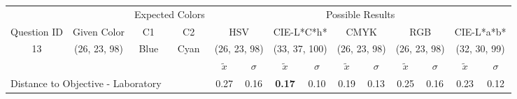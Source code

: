 \begin{table}[H]
  \resizebox{\textwidth}{!} {
  \begin{tabular}{lccccccccccccc}
    \hline
    \multicolumn{1}{c}{}                              &                                      & \multicolumn{2}{c}{Expected Colors}                   & \multicolumn{10}{c}{Possible Results}                                                                                                                                                                                                                                                                                        \\ \cline{3-14}
    \multicolumn{1}{c}{\multirow{-2}{*}{Question ID}} & \multirow{-2}{*}{Given Color}        & C1                       & C2                         & \multicolumn{2}{c}{HSV}                                        & \multicolumn{2}{c}{CIE-L*C*h*}                                 & \multicolumn{2}{c}{CMYK}                                       & \multicolumn{2}{c}{RGB}                                        & \multicolumn{2}{c}{CIE-L*a*b*}                                 \\ \hline
    \multicolumn{1}{c}{13}                             & \cellcolor[HTML]{0080FF}(26, 23, 98) & \multicolumn{1}{c|}{Blue} & \multicolumn{1}{c|}{Cyan}  & \multicolumn{2}{c|}{\cellcolor[HTML]{0080FF}(26, 23, 98)}      & \multicolumn{2}{c|}{\cellcolor[HTML]{00ACFF}(33, 37, 100)}       & \multicolumn{2}{c|}{\cellcolor[HTML]{0080FF}(26, 23, 98)}       & \multicolumn{2}{c|}{\cellcolor[HTML]{0080FF}(26, 23, 98)}       & \multicolumn{2}{c|}{\cellcolor[HTML]{5792FF}(32, 30, 99)}       \\ \hline
                                                      & \multicolumn{1}{l}{}                 & \multicolumn{1}{l}{}     & \multicolumn{1}{l}{}       & \multicolumn{1}{c}{$\tilde{x}$} & \multicolumn{1}{c}{$\sigma$} & \multicolumn{1}{c}{$\tilde{x}$} & \multicolumn{1}{c}{$\sigma$} & \multicolumn{1}{c}{$\tilde{x}$} & \multicolumn{1}{c}{$\sigma$} & \multicolumn{1}{c}{$\tilde{x}$} & \multicolumn{1}{c}{$\sigma$} & \multicolumn{1}{c}{$\tilde{x}$} & \multicolumn{1}{c}{$\sigma$} \\ \hline
    \multicolumn{4}{l}{Distance to Objective - Laboratory}                                                                                           & \multicolumn{1}{|c}{0.27}       & \multicolumn{1}{c|}{0.16}    & \multicolumn{1}{|c}{\textbf{0.17}}       & \multicolumn{1}{c|}{0.10}    & \multicolumn{1}{|c}{0.19}       & \multicolumn{1}{c|}{0.13}    & \multicolumn{1}{|c}{0.25}       & \multicolumn{1}{c|}{0.16}    & \multicolumn{1}{|c}{0.23}       & \multicolumn{1}{c|}{0.12}    \\

\end{tabular}}
\end{table}
